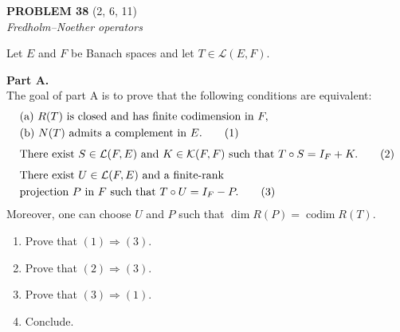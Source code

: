\documentclass[12pt]{article}
\begin{document}
\noindent\textbf{PROBLEM 38} (2, 6, 11)\\[4pt]
\textit{Fredholm--Noether operators}
 
\medskip
 
Let $E$ and $F$ be Banach spaces and let $T \in \mathcal{L}(E,F)$.
 
\medskip
 
\noindent\textbf{Part A.}\\
The goal of part A is to prove that the following conditions are equivalent:
\begin{align}
&\text{(a) } R(T) \text{ is closed and has finite codimension in } F, \notag\\
&\text{(b) } N(T) \text{ admits a complement in } E. \tag{1}\\[4pt]
&\text{There exist } S \in \mathcal{L}(F,E) \text{ and } K \in \mathcal{K}(F,F) \text{ such that }
T \circ S = I_F + K. \tag{2}\\[4pt]
&\text{There exist } U \in \mathcal{L}(F,E) \text{ and a finite-rank} \notag\\
&\text{projection } P \text{ in } F \text{ such that } T \circ U = I_F - P. \tag{3}
\end{align}
Moreover, one can choose $U$ and $P$ such that $\dim R(P) = \operatorname{codim} R(T)$.
 
\begin{enumerate}
\item Prove that $(1) \Rightarrow (3)$.
 
\noindent[\textit{Hint:} Let $X$ be a complement of $N(T)$ in $E$. Then $T|_X$ is bijective from $X$ onto
$R(T)$. Denote by $U_0$ its inverse. Let $Q$ be a projection from $F$ onto $R(T)$ and
set $U = U_0 \circ Q$.]
 
\item Prove that $(2) \Rightarrow (3)$.
 
 
\item Prove that $(3) \Rightarrow (1)$.
 
\noindent[\textit{Hint:} To establish part (a) of (1) note that $R(T) \supset R(I_F - P)$ and apply
Proposition 11.5. Similarly, show that $R(U)$ is closed and thus $R(U^*)$ is also
closed. Finally, prove that there exist finite-dimensional spaces $\Sigma_1$ and $\Sigma_2$ in
$E$ such that $N(T) + R(U) + \Sigma_1 = E$ and $N(T) \cap R(U) \subset \Sigma_2$. Then apply
Proposition 11.7.]
 
\item Conclude.
\end{enumerate}
 
\end{document}
